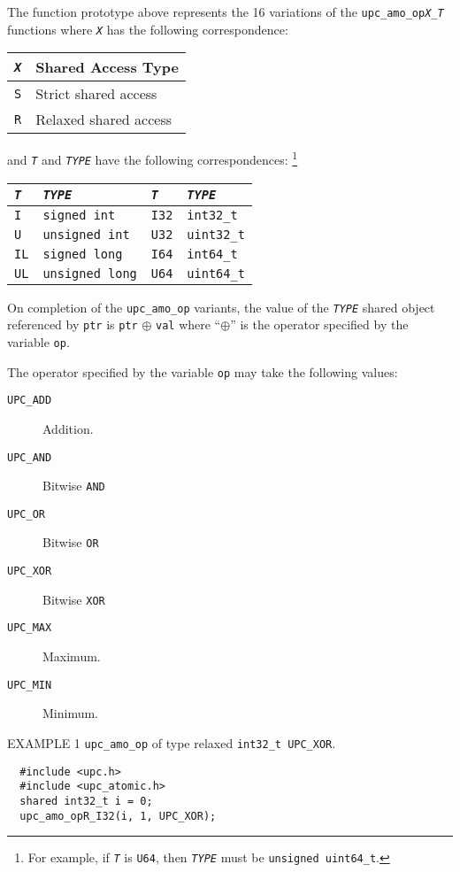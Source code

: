 \np The function prototype above represents the 16 variations of the
    {\tt upc\_amo\_op{\em X}\_{\em T}} functions where {\tt{\em X}} has the
    following correspondence:
\begin{center}
\begin{tabular}{ll}
{\tt{\em X}} & {Shared Access Type} \\ \hline
{\tt S} & {Strict shared access} \\
{\tt R} & {Relaxed shared access} \\
\end{tabular}
\end{center}
    and {\tt{\em T}} and {\tt{\em TYPE}} have the following correspondences:
    \footnote{For example, if {\tt{\em T}} is {\tt U64}, then 
      {\tt{\em TYPE}} must be {\tt unsigned uint64\_t}.}
\begin{center}
\begin{tabular}{ll|ll}
{\tt{\em T}} & {\tt{\em TYPE}} \hspace*{1.5in} &
{\tt{\em T}} & {\tt{\em TYPE}} \\ \hline
{\tt I} & {\tt signed int} &
{\tt I32} & {\tt int32\_t} \\
{\tt U} & {\tt unsigned int} &
{\tt U32} & {\tt uint32\_t} \\
{\tt IL} & {\tt signed long} &
{\tt I64} & {\tt int64\_t} \\
{\tt UL} & {\tt unsigned long} &
{\tt U64} & {\tt uint64\_t} \\
\end{tabular}
\end{center}
    
\np On completion of the {\tt upc\_amo\_op} variants, the value of the
    {\tt{\em TYPE}} shared object referenced by {\tt ptr} is 
    {\tt *ptr} $\oplus$ {\tt val} where ``$\oplus$'' is the operator
    specified by the variable {\tt op}.

\np The operator specified by the variable {\tt op} may take the following
    values:
\begin{description}
\item[{\tt UPC\_ADD}] Addition.
\item[{\tt UPC\_AND}] Bitwise {\tt AND}
\item[{\tt UPC\_OR}] Bitwise {\tt OR}
\item[{\tt UPC\_XOR}] Bitwise {\tt XOR}
\item[{\tt UPC\_MAX}] Maximum.
\item[{\tt UPC\_MIN}] Minimum.
\end{description}

\np EXAMPLE 1 {\tt upc\_amo\_op} of type relaxed {\tt int32\_t UPC\_XOR}.
\begin{verbatim}
  #include <upc.h>
  #include <upc_atomic.h>
  shared int32_t i = 0;
  upc_amo_opR_I32(i, 1, UPC_XOR);
\end{verbatim}
